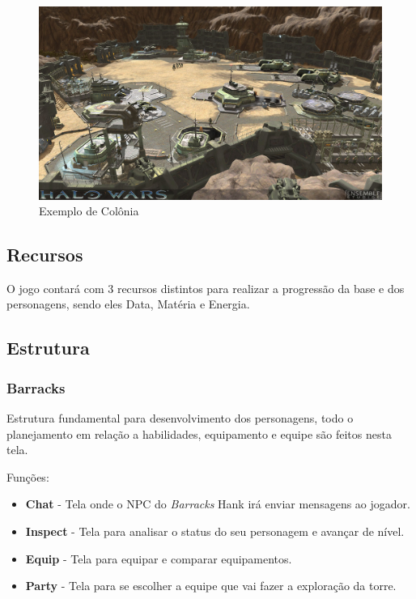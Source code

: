 \documentclass[11pt]{article} %
\begin{document}
\begin{figure}[!htp]
\centering
\includegraphics[scale=0.3]{res/base_building.png}
\caption{Exemplo de Colônia}
\label{Exemplo de Base Building}
\end{figure}

\subsection{Recursos}

O jogo contará com 3 recursos distintos para realizar a progressão da base e dos personagens, sendo eles Data, Matéria e Energia.

\subsection{Estrutura}

\subsubsection{Barracks}
Estrutura fundamental para desenvolvimento dos personagens, todo o planejamento em relação a habilidades, equipamento e equipe são feitos nesta tela.

Funções:
\begin{itemize}
  \item \textbf{Chat} - Tela onde o NPC do \textit{Barracks} Hank irá enviar mensagens ao jogador.
  \item \textbf{Inspect} - Tela para analisar o status do seu personagem e avançar de nível.
  \item \textbf{Equip} - Tela para equipar e comparar equipamentos.
  \item \textbf{Party} - Tela para se escolher a equipe que vai fazer a exploração da torre.
\end{itemize}
\end{document}
